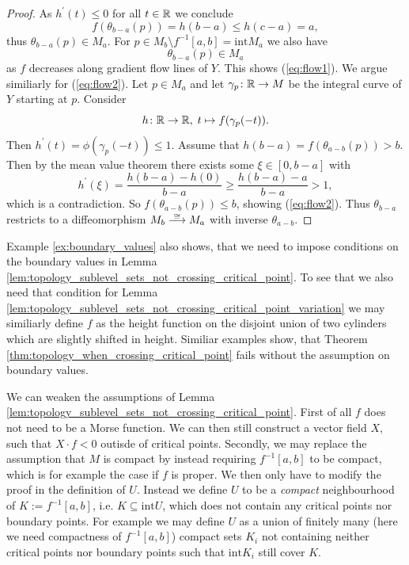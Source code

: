 \begin{proof}
        As $h^\prime(t) \leq 0$ for all $t \in \mathbb{R}$ we conclude
        \[
        f(\theta_{b-a}(p)) = h(b-a) \leq h(c-a) = a,
        \]
        thus $\theta_{b-a}(p) \in M_a$. For $p \in M_b \setminus f^{-1}[a,b] = \mathrm{int}{M_a}$ we also have 
        \[
        \theta_{b-a}(p) \in M_a
        \]
        as $f$ decreases along gradient flow lines of $Y$. This shows (\ref{eq:flow1}). We argue similiarly for (\ref{eq:flow2}). Let $p \in M_a$ and let $\gamma_p \colon \mathbb{R} \to M$ be the integral curve of $Y$ starting at $p$. Consider
        \[
        h \colon \mathbb{R} \to \mathbb{R}, \; t \mapsto f(\gamma_p(-t)).
        \]
        Then $h^\prime(t) = \phi(\gamma_p(-t)) \leq 1$. Assume that $h(b-a) = f(\theta_{a-b}(p)) > b$. Then by the mean value theorem there exists some $\xi \in [0,b-a]$ with 
        \[
        h^\prime(\xi) = \frac{h(b-a) - h(0)}{b-a} \geq \frac{h(b-a) - a}{b-a} > 1,
        \]
        which is a contradiction. So $f(\theta_{a-b}(p)) \leq b$, showing (\ref{eq:flow2}). Thus $\theta_{b-a}$ restricts to a diffeomorphism $M_b \oset[1pt]{\cong}{\longrightarrow} M_a$ with inverse $\theta_{a-b}$.
    \end{proof}

    \begin{counterexample}
        Example \ref{ex:boundary_values} also shows, that we need to impose conditions on the boundary values in Lemma \ref{lem:topology_sublevel_sets_not_crossing_critical_point}. To see that we also need that condition for Lemma \ref{lem:topology_sublevel_sets_not_crossing_critical_point_variation} we may similiarly define $f$ as the height function on the disjoint union of two cylinders which are slightly shifted in height. Similiar examples show, that Theorem \ref{thm:topology_when_crossing_critical_point} fails without the assumption on boundary values.
    \end{counterexample}

    \begin{remark}
        We can weaken the assumptions of Lemma \ref{lem:topology_sublevel_sets_not_crossing_critical_point}. First of all $f$ does not need to be a Morse function. We can then still construct a vector field $X$, such that $X \cdot f < 0$ outisde of critical points. Secondly, we may replace the assumption that $M$ is compact by instead requiring $f^{-1}[a,b]$ to be compact, which is for example the case if $f$ is proper. We then only have to modify the proof in the definition of $U$. Instead we define $U$ to be a \textit{compact} neighbourhood of $K := f^{-1}[a,b]$, i.e. $K \subseteq \mathrm{int} U$, which does not contain any critical points nor boundary points. For example we may define $U$ as a union of finitely many (here we need compactness of $f^{-1}[a,b]$) compact sets $K_i$ not containing neither critical points nor boundary points such that $\mathrm{int} K_i$ still cover $K$. 
    \end{remark}

